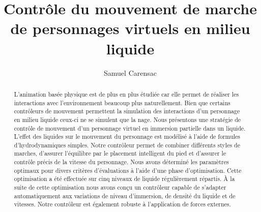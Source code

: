 \documentclass[runningheads,a4paper]{llncs}
\begin{document}
\mainmatter  %

\title{Contrôle du mouvement de marche\\ de personnages virtuels en milieu liquide}


%
%
\author{Samuel Carensac}
%


%
%

\maketitle


\begin{abstract}
 L'animation basée physique est de plus en plus étudiée car elle permet de réaliser les interactions avec l'environnement beaucoup plus naturellement. Bien que certains contrôleurs de mouvement permettent la simulation des interactions d'un personnage en milieu liquide ceux-ci ne se simulent que la nage. Nous présentons une stratégie de contrôle de mouvement d'un personnage virtuel en immersion partielle dans un liquide. L'effet des liquides sur le mouvement du personnage est modélisé à l'aide de formules d'hydrodynamiques simples. Notre contrôleur permet de combiner différents styles de marches, d'assurer l'équilibre par le placement intelligent du pied et d'assurer le contrôle précis de la vitesse du personnage. Nous avons déterminé les paramètres optimaux pour divers critères d'évaluations à l'aide d'une phase d'optimisation. Cette optimisation a été effectuée sur cinq niveaux de liquide régulièrement répartis.
\`A la suite de cette optimisation nous avons conçu un contrôleur capable de s'adapter automatiquement aux variations de niveau d'immersion, de densité du liquide et de vitesses. Notre contrôleur est également robuste à l'application de forces externes.
\end{abstract}
\end{document}
